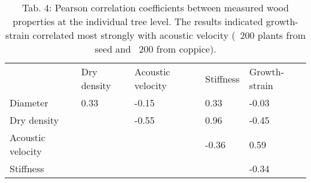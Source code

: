 \begin{table}
\centering
\caption{Tab. 4: Pearson correlation coefficients between measured wood properties at the individual tree level. The results indicated growth-strain correlated most strongly with acoustic velocity (~200 plants from seed and ~200 from coppice). }
\begin{tabular}{lllll}
                  & Dry density & Acoustic velocity & Stiffness & Growth-strain \\
Diameter          & 0.33        & -0.15             & 0.33      & -0.03         \\
Dry density       &             & -0.55             & 0.96      & -0.45         \\
Acoustic velocity &             &                   & -0.36     & 0.59          \\
Stiffness         &             &                   &           & -0.34        
\end{tabular}
\end{table}